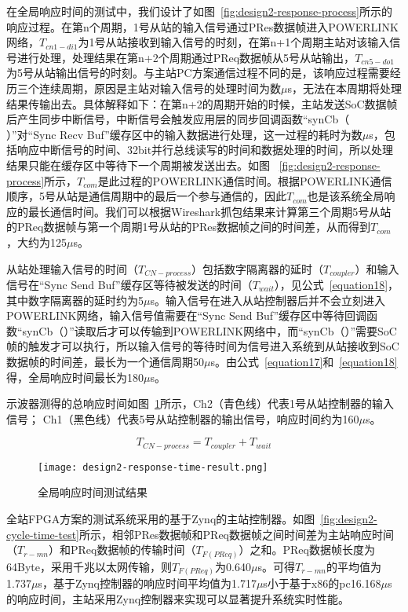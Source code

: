 在全局响应时间的测试中，我们设计了如图~\ref{fig:design2-response-process}所示的响应过程。在第n个周期，1号从站的输入信号通过PRes数据帧进入POWERLINK网络，$T_{cn1-di1}$为1号从站接收到输入信号的时刻，在第n+1个周期主站对该输入信号进行处理，处理结果在第n+2个周期通过PReq数据帧从5号从站输出，$T_{cn5-do1}$为5号从站输出信号的时刻。与主站PC方案通信过程不同的是，该响应过程需要经历三个连续周期，原因是主站对输入信号的处理时间为数$\mu$s，无法在本周期将处理结果传输出去。具体解释如下：在第n+2的周期开始的时候，主站发送SoC数据帧后产生同步中断信号，中断信号会触发应用层的同步回调函数“synCb（ ）”对“Sync Recv Buf”缓存区中的输入数据进行处理，这一过程的耗时为数$\mu$s，包括响应中断信号的时间、32bit并行总线读写的时间和数据处理的时间，所以处理结果只能在缓存区中等待下一个周期被发送出去。如图 ~\ref{fig:design2-response-process}所示，$T_{com}$是此过程的POWERLINK通信时间。根据POWERLINK通信顺序，5号从站是通信周期中的最后一个参与通信的，因此$T_{com}$也是该系统全局响应的最长通信时间。我们可以根据Wireshark抓包结果来计算第三个周期5号从站的PReq数据帧与第一个周期1号从站的PRes数据帧之间的时间差，从而得到$T_{com}$，大约为125$\mu$s。

从站处理输入信号的时间（$T_{CN-process}$）包括数字隔离器的延时（$T_{coupler}$）和输入信号在“Sync Send Buf”缓存区等待被发送的时间（$T_{wait}$），见公式~\ref{equation18}，其中数字隔离器的延时约为5$\mu$s。输入信号在进入从站控制器后并不会立刻进入POWERLINK网络，输入信号值需要在“Sync Send Buf”缓存区中等待回调函数“synCb（）”读取后才可以传输到POWERLINK网络中，而“synCb（）”需要SoC帧的触发才可以执行，所以输入信号的等待时间为信号进入系统到从站接收到SoC数据帧的时间差，最长为一个通信周期50$\mu$s。由公式~\ref{equation17}和~\ref{equation18}得，全局响应时间最长为180$\mu$s。

示波器测得的总响应时间如图~\ref{fig:design2-response-time-result}所示，Ch2（青色线）代表1号从站控制器的输入信号； Ch1（黑色线）代表5号从站控制器的输出信号，响应时间约为160$\mu$s。


\begin{equation}
\label{equation18}
T_{CN-process}=T_{coupler}+T_{wait}
\end{equation}

\begin{figure}[!htb]
  \centering
  \texttt{[image: design2-response-time-result.png]}
  \caption{全局响应时间测试结果}
  \label{fig:design2-response-time-result}
\end{figure}

全站FPGA方案的测试系统采用的基于Zynq的主站控制器。如图~\ref{fig:design2-cycle-time-test}所示，相邻PRes数据帧和PReq数据帧之间时间差为主站响应时间（$T_{r-mn}$）和PReq数据帧的传输时间（$T_{F(PReq)}$）之和。PReq数据帧长度为64Byte，采用千兆以太网传输，则$T_{F(PReq)}$为0.640$\mu$s。可得$T_{r-mn}$的平均值为1.737$\mu$s，基于Zynq控制器的响应时间平均值为1.717$\mu$s小于基于x86的pc16.168$\mu$s的响应时间，主站采用Zynq控制器来实现可以显著提升系统实时性能。

